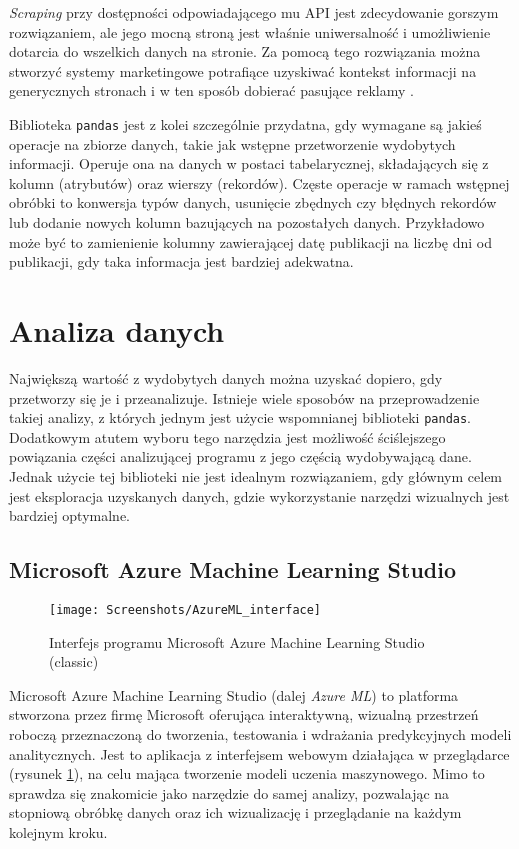 \emph{Scraping} przy dostępności odpowiadającego mu API jest zdecydowanie gorszym rozwiązaniem, ale jego mocną stroną jest właśnie uniwersalność i umożliwienie dotarcia do wszelkich danych na stronie.
Za pomocą tego rozwiązania można stworzyć systemy marketingowe potrafiące uzyskiwać kontekst informacji na generycznych stronach i w ten sposób dobierać pasujące reklamy \cite{vargiu2013exploiting}.

Biblioteka \texttt{pandas} jest z kolei szczególnie przydatna, gdy wymagane są jakieś operacje na zbiorze danych, takie jak wstępne przetworzenie wydobytych informacji.
Operuje ona na danych w postaci tabelarycznej, składających się z kolumn (atrybutów) oraz wierszy (rekordów).
Częste operacje w ramach wstępnej obróbki to konwersja typów danych, usunięcie zbędnych czy błędnych rekordów lub dodanie nowych kolumn bazujących na pozostałych danych.
Przykładowo może być to zamienienie kolumny zawierającej datę publikacji na liczbę dni od publikacji, gdy taka informacja jest bardziej adekwatna.

\section{Analiza danych}

Największą wartość z wydobytych danych można uzyskać dopiero, gdy przetworzy się je i przeanalizuje.
Istnieje wiele sposobów na przeprowadzenie takiej analizy, z których jednym jest użycie wspomnianej biblioteki \texttt{pandas}.
Dodatkowym atutem wyboru tego narzędzia jest możliwość ściślejszego powiązania części analizującej programu z jego częścią wydobywającą dane.
Jednak użycie tej biblioteki nie jest idealnym rozwiązaniem, gdy głównym celem jest eksploracja uzyskanych danych, gdzie wykorzystanie narzędzi wizualnych jest bardziej optymalne.

\subsection{Microsoft Azure Machine Learning Studio}

\begin{figure}[ht]
	\texttt{[image: Screenshots/AzureML\_interface]}
	\caption{Interfejs programu Microsoft Azure Machine Learning Studio (classic)}
	\label{fig:interface}
\end{figure}

Microsoft Azure Machine Learning Studio (dalej \emph{Azure ML}) to platforma stworzona przez firmę Microsoft oferująca interaktywną, wizualną przestrzeń roboczą przeznaczoną do tworzenia, testowania i wdrażania predykcyjnych modeli analitycznych.
Jest to aplikacja z interfejsem webowym działająca w przeglądarce (rysunek \ref{fig:interface}), na celu mająca tworzenie modeli uczenia maszynowego.
Mimo to sprawdza się znakomicie jako narzędzie do samej analizy, pozwalając na stopniową obróbkę danych oraz ich wizualizację i przeglądanie na każdym kolejnym kroku.

